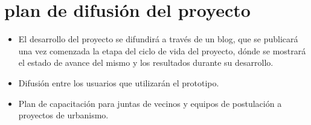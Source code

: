\documentclass[12pt]{article}
\begin{document}
\section{plan de difusión del proyecto}
\begin{itemize}
    \item El desarrollo del proyecto se difundirá a través de un blog, que
      se publicará una vez comenzada la etapa del ciclo de vida del
      proyecto, dónde se mostrará el estado de avance del mismo y los
      resultados durante su desarrollo.
    \item Difusión entre los usuarios que utilizarán el prototipo.
    \item Plan de capacitación para juntas de vecinos y equipos de
      postulación a proyectos de urbanismo.
\end{itemize}
\end{document}
